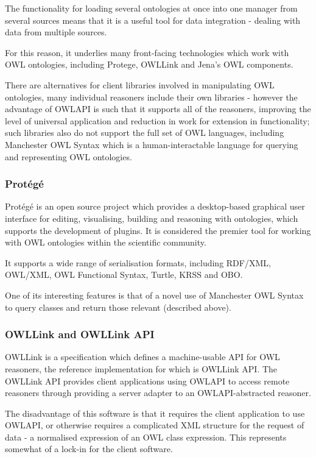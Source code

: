 \documentclass{article}
\begin{document}
The functionality for loading several ontologies at once into one manager from
several sources means that it is a useful tool for data integration - dealing
with data from multiple sources.

For this reason, it underlies many front-facing technologies which work with OWL
ontologies, including Protege, OWLLink and Jena's OWL components.

There are alternatives for client libraries involved in manipulating OWL
ontologies, many individual reasoners include their own libraries - however the
advantage of OWLAPI is such that it supports all of the reasoners, improving
the level of universal application and reduction in work for extension in
functionality; such libraries also do not support the full set of OWL languages,
including Manchester OWL Syntax which is a human-interactable language for
querying and representing OWL ontologies.

\subsubsection{Protégé}

Protégé is an open source project which provides a desktop-based graphical user
interface for editing, visualising, building and reasoning with ontologies, which supports
the development of plugins.\cite{prot} It is considered the premier tool for working with
OWL ontologies within the scientific community.

It supports a wide range of serialisation formats, including RDF/XML, OWL/XML,
OWL Functional Syntax, Turtle, KRSS and OBO.\cite{protowl}

One of its interesting features is that of a novel use of Manchester OWL Syntax
to query classes and return those relevant (described above).

\subsubsection{OWLLink and OWLLink API}

OWLLink is a specification which defines a machine-usable API for OWL reasoners,
the reference implementation for which is OWLLink API. The OWLLink API provides
client applications using OWLAPI to access remote reasoners through providing a
server adapter to an OWLAPI-abstracted reasoner.\cite{owllink} 

The disadvantage of this software is that it requires the client application
to use OWLAPI, or otherwise requires a complicated XML structure for the
request of data - a normalised expression of an OWL class expression. This
represents somewhat of a lock-in for the client software. 
\end{document}
